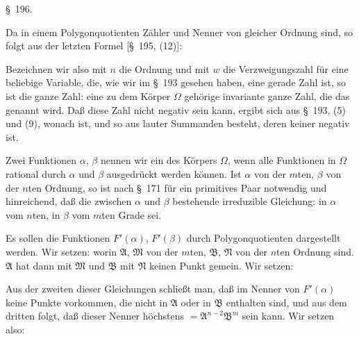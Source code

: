 \S\ 196. 

Da in einem Polygonquotienten Z\"ahler und Nenner von gleicher Ordnung sind, so folgt aus der letzten Formel [\S\ 195, (12)]:

Bezeichnen wir also mit $n$ die Ordnung und mit $w$ die Verzweigungszahl f\"ur eine beliebige Variable, die, wie wir im \S\ 193 gesehen haben, eine gerade Zahl ist, so ist die ganze Zahl:
eine zu dem K\"orper $\Omega$ geh\"orige invariante ganze Zahl, die das  genannt wird. Da\ss{} diese Zahl nicht negativ sein kann, ergibt sich aus \S\ 193, (5) und (9), wonach
ist, und so aus lauter Summanden besteht, deren keiner negativ ist.

Zwei Funktionen $\alpha$, $\beta$ nennen wir ein  des K\"orpers $\Omega$, wenn alle Funktionen in $\Omega$ rational durch $\alpha$ und $\beta$ ausgedr\"uckt werden k\"onnen. Ist $\alpha$ von der $m$ten, $\beta$ von der $n$ten Ordnung, so ist nach \S\ 171 f\"ur ein primitives Paar notwendig und hinreichend, da\ss{} die zwischen $\alpha$ und $\beta$ bestehende irreduzible Gleichung:
in $\alpha$ vom $n$ten, in $\beta$ vom $m$ten Grade sei.

Es sollen die Funktionen $F'(\alpha)$, $F'(\beta)$ durch Polygonquotienten dargestellt werden. Wir setzen:
worin $\mathfrak{A}$, $\mathfrak{M}$ von der $m$ten, $\mathfrak{B}$, $\mathfrak{N}$ von der $n$ten Ordnung sind. $\mathfrak{A}$ hat dann mit $\mathfrak{M}$ und $\mathfrak{B}$ mit $\mathfrak{N}$ keinen Punkt gemein. Wir setzen:

Aus der zweiten dieser Gleichungen schlie\ss{}t man, da\ss{} im Nenner von $F'(\alpha)$ keine Punkte vorkommen, die nicht in $\mathfrak{A}$ oder in $\mathfrak{B}$ enthalten sind, und aus dem dritten folgt, da\ss{} dieser Nenner h\"ochstens $= \mathfrak{A}^{n-2}\mathfrak{B}^m$ sein kann. Wir setzen also:
